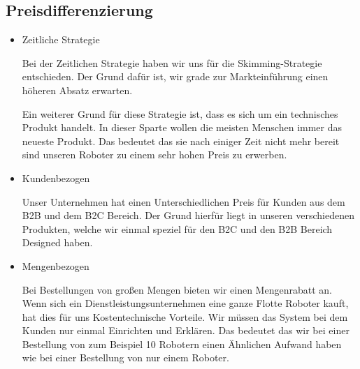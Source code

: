 \subsection{Preisdifferenzierung} 
    \begin{itemize}
        \item Zeitliche Strategie
            
        Bei der Zeitlichen Strategie haben wir uns für die Skimming-Strategie entschieden. Der Grund dafür ist, 
        wir grade zur Markteinführung einen höheren Absatz erwarten. 

        Ein weiterer Grund für diese Strategie ist, dass es sich um ein technisches Produkt handelt. In dieser
        Sparte wollen die meisten Menschen immer das neueste Produkt. Das bedeutet das sie nach einiger Zeit 
        nicht mehr bereit sind unseren Roboter zu einem sehr hohen Preis zu erwerben.

        \item Kundenbezogen

            Unser Unternehmen hat einen Unterschiedlichen Preis für Kunden aus dem B2B und dem B2C Bereich. Der Grund 
            hierfür liegt in unseren verschiedenen Produkten, welche wir einmal speziel für den B2C und den B2B Bereich
            Designed haben.

        \item Mengenbezogen
        
            Bei Bestellungen von großen Mengen bieten wir einen Mengenrabatt an. Wenn sich ein 
            Dienstleistungsunternehmen eine ganze Flotte Roboter kauft, hat dies für uns Kostentechnische Vorteile.
            Wir müssen das System bei dem Kunden nur einmal Einrichten und Erklären. Das bedeutet das wir bei einer 
            Bestellung von zum Beispiel 10 Robotern einen Ähnlichen Aufwand haben wie bei einer Bestellung von nur einem 
            Roboter.
        \end{itemize}